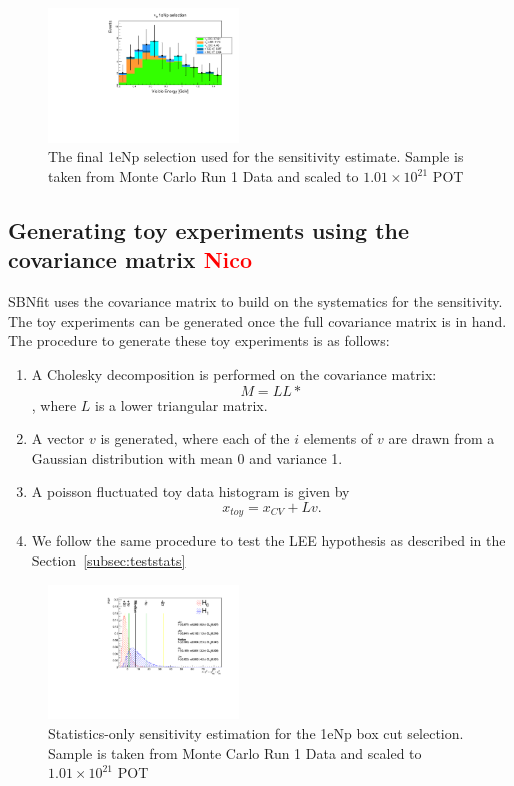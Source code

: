 \documentclass[a4paper]{article}
\begin{document}
\begin{figure}[H]
\begin{center}
\includegraphics[width=0.45\textwidth]{Sensitivity/nue_reco_e_genietune_run1_nueStacked.pdf}
\caption{\label{fig:1eNp:box:sensitivitysample} The final 1eNp selection used for the sensitivity estimate. Sample is taken from Monte Carlo Run 1 Data and scaled to $1.01\times10^{21}$ POT}
\end{center}
\end{figure}


\subsection{Generating toy experiments using the covariance matrix \textcolor{red}{Nico}}
SBNfit uses the covariance matrix to build on the systematics for the sensitivity. The toy experiments can be generated once the full covariance matrix is in hand. The procedure to generate these toy experiments is as follows:
\begin{enumerate}
    \item A Cholesky decomposition is performed on the covariance matrix: $$M = LL*$$,
    where $L$ is a lower triangular matrix.
    \item A vector $v$ is generated, where each of the $i$ elements of $v$ are drawn from a Gaussian distribution with mean 0 and variance 1.
    \item A poisson fluctuated toy data histogram is given by
$$x_{toy} = x_{CV} + Lv.$$
    \item We follow the same procedure to test the LEE hypothesis as described in the Section~\ref{subsec:teststats}
\end{enumerate}

\begin{figure}[H]
\begin{center}
\includegraphics[width=0.45\textwidth]{Sensitivity/SBNfit_Cls_nue_reco_e_genietune_run1_LEE_deltachi_statonly.pdf}
\caption{\label{fig:1eNp:box:statonlysensitivity} Statistics-only sensitivity estimation for the 1eNp box cut selection. Sample is taken from Monte Carlo Run 1 Data and scaled to $1.01\times10^{21}$ POT}
\end{center}
\end{figure}
\end{document}
